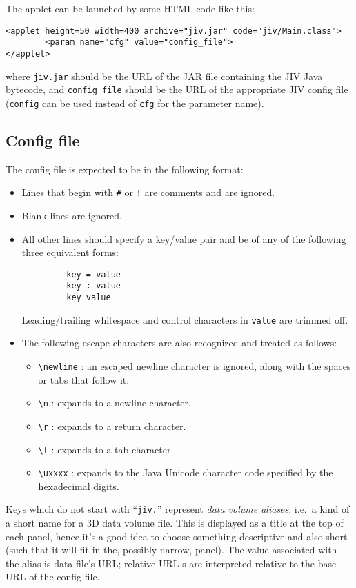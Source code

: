 The applet can be launched by some HTML code like this:
\begin{verbatim}
<applet height=50 width=400 archive="jiv.jar" code="jiv/Main.class">
        <param name="cfg" value="config_file">
</applet>
\end{verbatim}
where \verb+jiv.jar+ should be the URL of the JAR file containing the
JIV Java bytecode, and \verb+config_file+ should be the URL of the
appropriate JIV config file (\verb+config+ can be used instead of
\verb+cfg+ for the parameter name).


\subsection{Config file}
\label{sec:config-file}

The config file is expected to be in the following format:
\begin{itemize}
\item Lines that begin with \verb|#| or \verb|!| are comments and are
  ignored. 
\item Blank lines are ignored.
\item All other lines should specify a key/value pair and be of any of
  the following three equivalent forms:
\begin{verbatim}
         key = value
         key : value
         key value
\end{verbatim}
  Leading/trailing whitespace and control characters in \verb|value|
  are trimmed off.
\item The following escape characters are also recognized and
  treated as follows: 
  \begin{itemize}
  \item \verb|\newline| : 
    an escaped newline character is ignored, along with the spaces or
    tabs that follow it. 
  \item \verb|\n| : expands to a newline character.
  \item \verb|\r| : expands to a return character.
  \item \verb|\t| : expands to a tab character.
  \item \verb|\uxxxx| : expands to the Java Unicode character code
    specified by the hexadecimal digits.  
  \end{itemize}
\end{itemize} 

Keys which do not start with ``\verb+jiv.+'' represent {\em data
  volume aliases}, i.e.\ a kind of a short name for a 3D data volume
file. This is displayed as a title at the top of each panel, hence
it's a good idea to choose something descriptive and also short (such
that it will fit in the, possibly narrow, panel). The value associated
with the alias is data file's URL\@; relative URL-s are interpreted
relative to the base URL of the config file.


